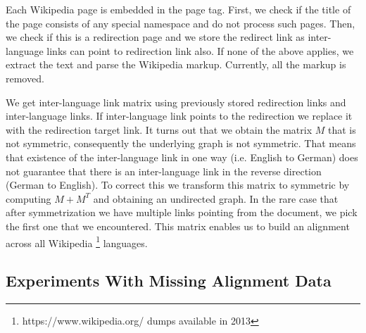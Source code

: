 \documentclass[twoside,11pt]{article}
\begin{document}
Each Wikipedia page is embedded in the page tag. First, we check if the title of the page consists of any special namespace and do not process such pages. Then, we check if this is a redirection page and we store the redirect link as inter-language links can point to redirection link also. If none of the above applies, we extract the text and parse the Wikipedia markup. Currently, all the markup is removed.

We get inter-language link matrix using previously stored redirection links and inter-language links. If inter-language link points to the redirection we replace it with the redirection target link. It turns out that we obtain the matrix $M$ that is not symmetric, consequently the underlying graph is not symmetric. That means that existence of the inter-language link in one way (i.e. English to German) does not guarantee that there is an inter-language link in the reverse direction (German to English). To correct this we transform this matrix to symmetric by computing $M+M^T$ and obtaining an undirected graph. In the rare case that after symmetrization we have multiple links pointing from the document, we pick the first one that we encountered. This matrix enables us to build an alignment across all Wikipedia \footnote{https://www.wikipedia.org/ dumps available in 2013} languages.

\subsection{Experiments With Missing Alignment Data}\label{experiments:hubcca}
\end{document}
